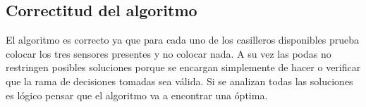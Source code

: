\subsection{Correctitud del algoritmo}
El algoritmo es correcto ya que para cada uno de los casilleros disponibles prueba colocar los tres sensores presentes y no colocar nada. A su vez las podas no restringen posibles soluciones porque se encargan simplemente de hacer o verificar que la rama de decisiones tomadas sea válida. Si se analizan todas las soluciones es lógico pensar que el algoritmo va a encontrar una óptima.

